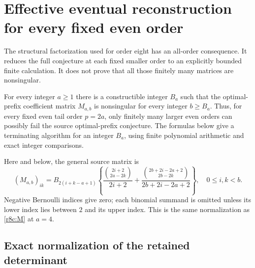 \section{Effective eventual reconstruction for every fixed even order}
\label{ert:section}

The structural factorization used for order eight has an all-order
consequence. It reduces the full conjecture at each fixed smaller
order to an explicitly bounded finite calculation. It does not prove
that all those finitely many matrices are nonsingular.

\begin{theorem}
\label{ert:main}
For every integer $a\ge1$ there is a constructible integer $B_a$
such that the optimal-prefix coefficient matrix $M_{a,b}$ is
nonsingular for every integer $b\ge B_a$. Thus, for every fixed
even tail order $p=2a$, only finitely many larger even orders can
possibly fail the source optimal-prefix conjecture. The formulas
below give a terminating algorithm for an integer $B_a$, using
finite polynomial arithmetic and exact integer comparisons.
\end{theorem}

Here and below, the general source matrix is
\begin{equation}\label{ert:M}
 (M_{a,b})_{ik}=B_{2(i+k-a+1)}
 \left\{\frac{\binom{2i+2}{2a-2k}}{2i+2}
 +\frac{\binom{2b+2i-2a+2}{2b-2k}}{2b+2i-2a+2}\right\},
 \quad0\le i,k<b.
\end{equation}
Negative Bernoulli indices give zero; each binomial summand is
omitted unless its lower index lies between $2$ and its upper index.
This is the same normalization as \eqref{r8c:M} at $a=4$.

\subsection{Exact normalization of the retained determinant}

